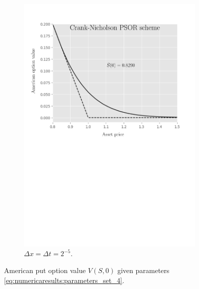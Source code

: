 \begin{figure}[H]
\begin{subfigure}{0.4\textwidth}
    \includegraphics[width=\textwidth]{chapters/chapter5/TestCase4CrankNicholsonLCP.pdf}
    \caption{$\Delta{x}=\Delta{t}=2^{-5}$.}
  \end{subfigure}
  \caption{American put option value $V(S, 0)$ given parameters \eqref{eq:numericaresults:parameters_set_4}.}
  \label{fig:lcp:numericaresults:test_case_4}
\end{figure}

